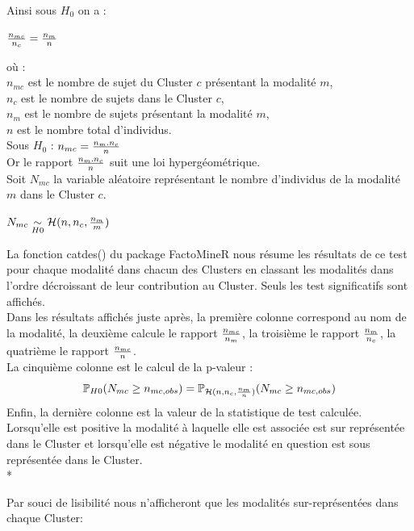 \documentclass{book}
\begin{document}
\noindent
Ainsi sous $H_0$ on a :
\begin{center}
${{n_{mc}} \over {n_c}} = {{n_m} \over {n}}$
\end{center} 
où :\\
$n_{mc}$ est le nombre de sujet du Cluster $c$ présentant la modalité $m$,\\
$n_c$ est le nombre de sujets dans le Cluster $c$,\\
$n_m$ est le nombre de sujets présentant la modalité $m$,\\
$n$ est le nombre total d'individus.\\
	
\noindent
Sous $H_0$ : $n_{mc}  = {n_m . n_c \over {n}} $\\
Or le rapport ${n_m . n_c \over {n}} $ suit une loi hypergéométrique.\\
Soit $N_{mc}$ la variable aléatoire représentant le nombre d'individus de la modalité $m$ dans le Cluster $c$.
\begin{center}
$ N_{mc} \underset{H0}{\sim} \mathcal{H}(n, n_c, {{n_m}\over {m}})$
\end{center}

\noindent
La fonction catdes() du package FactoMineR nous résume les résultats de ce test pour chaque modalité dans chacun des Clusters en classant les modalités dans l'ordre décroissant de leur contribution au Cluster.
Seuls les test significatifs sont affichés.\\

\noindent
Dans les résultats affichés juste après, la première colonne correspond au nom de la modalité, la deuxième calcule le rapport $n_{mc} \over n_m$, la troisième le rapport $n_m \over n_c$, la quatrième le rapport $n_{mc} \over n$.\\
La cinquième colonne est le calcul de la p-valeur :\\
\begin{equation}
\mathbb{P}_{H0}(N_{mc} \geq n_{mc, obs}) =  \mathbb{P}_{\mathcal{H}(n, n_c, {n_m \over n})}(N_{mc} \geq n_{mc, obs})
\end{equation} 
Enfin, la dernière colonne est la valeur de la statistique de test calculée. Lorsqu'elle est positive la modalité à laquelle elle est associée est sur représentée dans le Cluster et lorsqu'elle est négative le modalité en question est sous représentée dans le Cluster.\\*

\noindent
Par souci de lisibilité nous n'afficheront que les modalités sur-représentées dans chaque Cluster:
\end{document}
